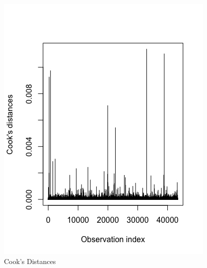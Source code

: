 \documentclass[11pt, oneside]{article}   	%
\begin{document}



  \FloatBarrier
  \begin{figure}[!ht]
    \centering
    \includegraphics[scale=.42]{pp33.png} 
    \caption{Cook's Distances}
  \end{figure}
  \FloatBarrier
  
\end{document}
